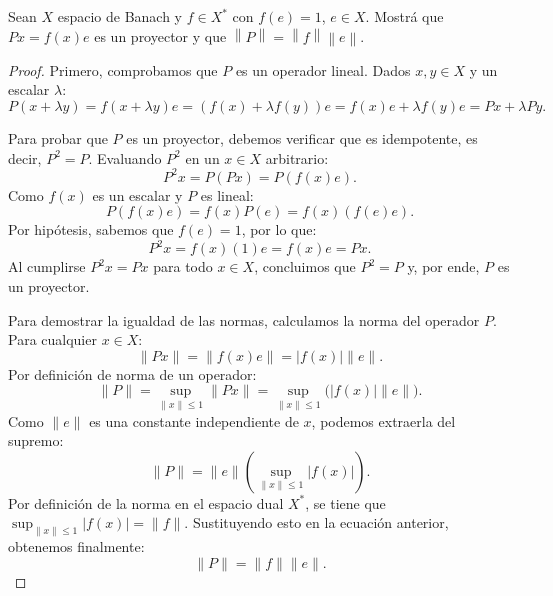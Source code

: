 \documentclass{article}
\theoremstyle{definition}
\newcommand{\norm}[1]{\left\lVert #1 \right\rVert}       %
\newenvironment{ejercicio}[1]{\begin{trivlist}
\item[\hskip \labelsep {\bfseries Ejercicio}\hskip \labelsep {\bfseries #1.}]}{\end{trivlist}}
\begin{document}
\begin{ejercicio}{1}
	Sean \( X \) espacio de Banach y \( f \in X^* \) con \( f(e) = 1 \), \( e \in X \). Mostrá que \( Px = f(x) e \) es un proyector y que \( \norm{P} = \norm{f} \norm{e} \).
\end{ejercicio}
\begin{proof}
	Primero, comprobamos que \( P \) es un operador lineal. Dados \( x, y \in X \) y un escalar \( \lambda \):
	\[ P(x + \lambda y) = f(x + \lambda y)e = (f(x) + \lambda f(y))e = f(x)e + \lambda f(y)e = Px + \lambda Py. \]

	Para probar que \( P \) es un proyector, debemos verificar que es idempotente, es decir, \( P^2 = P \). Evaluando \( P^2 \) en un \( x \in X \) arbitrario:
	\[ P^2 x = P(Px) = P(f(x)e). \]
	Como \( f(x) \) es un escalar y \( P \) es lineal:
	\[ P(f(x)e) = f(x)P(e) = f(x)(f(e)e). \]
	Por hipótesis, sabemos que \( f(e) = 1 \), por lo que:
	\[ P^2 x = f(x)(1)e = f(x)e = Px. \]
	Al cumplirse \( P^2 x = Px \) para todo \( x \in X \), concluimos que \( P^2 = P \) y, por ende, \( P \) es un proyector.

	Para demostrar la igualdad de las normas, calculamos la norma del operador \( P \). Para cualquier \( x \in X \):
	\[ \|Px\| = \|f(x)e\| = |f(x)| \|e\|. \]
	Por definición de norma de un operador:
	\[ \|P\| = \sup_{\|x\| \leq 1} \|Px\| = \sup_{\|x\| \leq 1} \big( |f(x)| \|e\| \big). \]
	Como \( \|e\| \) es una constante independiente de \( x \), podemos extraerla del supremo:
	\[ \|P\| = \|e\| \left( \sup_{\|x\| \leq 1} |f(x)| \right). \]
	Por definición de la norma en el espacio dual \( X^* \), se tiene que \( \sup_{\|x\| \leq 1} |f(x)| = \|f\| \). Sustituyendo esto en la ecuación anterior, obtenemos finalmente:
	\[ \|P\| = \|f\| \|e\|. \]
\end{proof}

\vspace{0.5cm}
\end{document}
